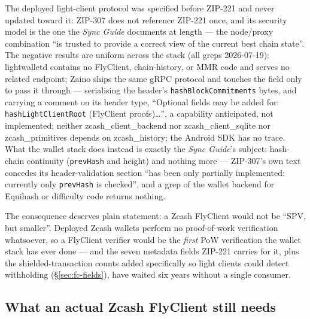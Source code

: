 \documentclass[11pt,a4paper]{article}
\theoremstyle{definition}
\begin{document}
The deployed light-client protocol was specified before ZIP-221 and
never updated toward it: ZIP-307 does not reference ZIP-221 once, and
its security model is the one the \emph{Sync Guide} documents at length
--- the node/proxy combination ``is trusted to provide a correct view
of the current best chain state''. The negative results are uniform
across the stack (all greps 2026-07-19): \textsf{lightwalletd} contains
no FlyClient, chain-history, or MMR code and serves no related
endpoint; \textsf{Zaino} ships the same gRPC protocol and touches the
field only to pass it through --- serialising the header's
\texttt{hashBlockCommitments} bytes, and carrying a comment on its header
type, ``Optional fields may be added for: \texttt{hashLightClientRoot}
(FlyClient proofs)\ldots'', a capability anticipated, not implemented;
neither
\textsf{zcash\_client\_backend} nor \textsf{zcash\_client\_sqlite} nor
\textsf{zcash\_primitives} depends on \textsf{zcash\_history}; the
Android SDK has no trace. What the wallet stack does instead is exactly
the \emph{Sync Guide}'s subject: hash-chain continuity
(\texttt{prevHash} and height) and nothing more --- ZIP-307's own text
concedes its header-validation section ``has been only partially
implemented: currently only \texttt{prevHash} is checked'', and a grep
of the wallet backend for Equihash or difficulty code returns nothing.

The consequence deserves plain statement: a Zcash FlyClient would not
be ``SPV, but smaller''. Deployed Zcash wallets perform no
proof-of-work verification whatsoever, so a FlyClient verifier would be
the \emph{first} PoW verification the wallet stack has ever done ---
and the seven metadata fields ZIP-221 carries for it, plus the
shielded-transaction counts added specifically so light clients could
detect withholding (\S\ref{sec:fc-fields}), have waited six years
without a single consumer.

\subsection{What an actual Zcash FlyClient still needs}
\label{sec:fc-missing}
\end{document}
